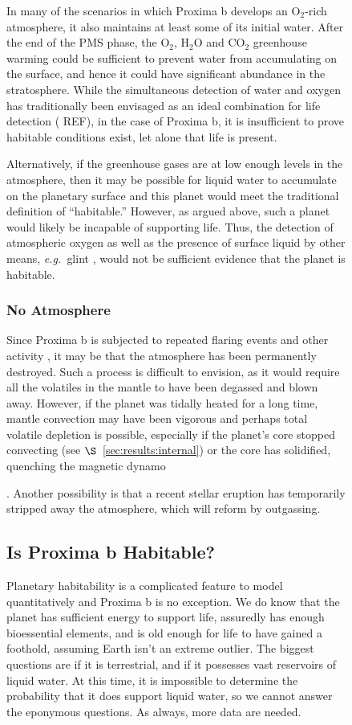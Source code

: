 \documentclass[preprint,12pt]{aastex}
\newcommand{\xxx}[1]{{\color{red} #1}} %
\def\eg{{\it e.g.\ }}
\begin{document}
\begin{figure}
In many of the scenarios in which Proxima b develops an O$_2$-rich atmosphere,
it also maintains at least some of its initial water.
After the end of the PMS phase, the O$_2$, H$_2$O and CO$_2$
greenhouse warming could be sufficient to prevent water from
accumulating on the surface, and hence it could have significant
abundance in the stratosphere. While the simultaneous detection of
water and oxygen has traditionally been envisaged as an ideal
combination for life detection (\xxx{REF}), in the case of Proxima b, it is
insufficient to prove habitable conditions exist, let alone that life
is present.

Alternatively, if the greenhouse gases are at low enough levels in the atmosphere,
then it may be possible for liquid water to accumulate on the
planetary surface and this planet would meet the traditional
definition of ``habitable.'' However, as argued above, such a planet
would likely be incapable of supporting life.
Thus, the detection of atmospheric oxygen as well as the
presence of surface liquid by other means, \eg glint
\citep{Robinson10}, would not be sufficient evidence that the planet
is habitable.

\subsubsection{No Atmosphere}
\label{sec:results:atmstates:noatmos}

Since Proxima b is subjected to repeated flaring events and other
activity \citep{Walker81,Davenport16}, it may be that the atmosphere
has been permanently destroyed. Such a process is difficult to
envision, as it would require all the volatiles in the mantle to have
been degassed and blown away. However, if the planet was tidally
heated for a long time, mantle convection may have been vigorous and
perhaps total volatile depletion is possible, especially if the
planet's core stopped convecting (see $\S$~\ref{sec:results:internal})
or the core has solidified, quenching the magnetic dynamo
{\citep{DriscollBarnes15}. Another possibility is that a recent
stellar eruption has temporarily stripped away the atmosphere, which
will reform by outgassing.

\subsection{Is Proxima b Habitable?}
\label{sec:results:habitable}

Planetary habitability is a complicated feature to model
quantitatively and Proxima b is no exception. We do know that the
planet has sufficient energy to support life, assuredly has enough
bioessential elements, and is old enough for life to have gained a
foothold, assuming Earth isn't an extreme outlier. The biggest
questions are if it is terrestrial, and if it possesses vast reservoirs
of liquid water. At this time, it is impossible to determine the
probability that it does support liquid water, so we cannot answer the
eponymous questions. As always, more data are needed.

}
\end{figure}
\end{document}
